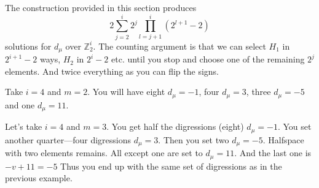 The construction provided in this section produces
\begin{equation}
    2 \sum\limits_{j=2}^i 2^j \prod\limits_{l=j+1}^i (2^{l+1}-2)
\end{equation}
solutions for $d_\mu$ over $\mathbb Z_2^i$. The counting argument is that we can select $H_1$ in $2^{i+1}-2$ ways, $H_2$ in $2^i-2$ etc. until you stop and choose one of the remaining $2^j$ elements. And twice everything as you can flip the signs.

\begin{example}
    Take $i=4$ and $m=2$. You will have eight $d_\mu=-1$, four $d_\mu=3$, three $d_\mu=-5$ and one $d_\mu=11$.
\end{example}

\begin{example}
    \label{z2i:example:edge}
    Let's take $i=4$ and $m=3$. You get half the digressions (eight) $d_\mu=-1$. You set another quarter---four digressions $d_\mu=3$. Then you set two $d_\mu=-5$. Halfspace with two elements remains. All except one are set to $d_\mu=11$. And the last one is $-v+11=-5$ Thus you end up with the same set of digressions as in the previous example.
\end{example}
